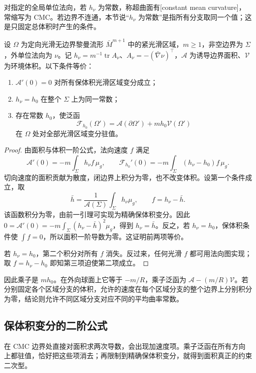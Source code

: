 对指定的全局单位法向，若 \(h_\nu\) 为常数，称超曲面有[constant mean curvature]，常缩写为 CMC。若边界不连通，本节说“\(h_\nu\) 为常数”是指所有分支取同一个值；这是只固定总体积时产生的条件。

\begin{theorem}\label{g3:thm:cmc-volume-critical}
	设 \(\Omega\) 为定向光滑无边界黎曼流形 \(\bar M^{m+1}\) 中的紧光滑区域，\(m\ge1\)，非空边界为 \(\Sigma\)，外单位法向为 \(\nu\)。记 \(h_\nu=m^{-1}\operatorname{tr}A_\nu\)、\(A_\nu=-(\bar\nabla\nu)^\top\)，\(\mathcal A\) 为诱导边界面积、\(\mathcal V\) 为环境体积。以下条件等价：
	\begin{enumerate}
		\item \(\mathcal A'(0)=0\) 对所有保体积光滑区域变分成立；
		\item \(h_\nu=h_0\) 在整个 \(\Sigma\) 上为同一常数；
		\item 存在常数 \(h_0\)，使泛函
		\begin{equation}\label{g3:eq:cmc-augmented-functional}
			\mathcal F_{h_0}(\Omega')
			=\mathcal A(\partial\Omega')+m h_0\mathcal V(\Omega')
		\end{equation}
		在 \(\Omega\) 处对全部光滑区域变分驻值。
	\end{enumerate}
\end{theorem}
\begin{proof}
	由面积与体积一阶公式，法向速度 \(f\) 满足
	\[
		\mathcal A'(0)=-m\int_\Sigma h_\nu f\,\mu_g,
		\qquad
		\mathcal F_{h_0}'(0)=-m\int_\Sigma(h_\nu-h_0)f\,\mu_g.
	\]
	切向速度的面积贡献为散度，闭边界上积分为零，也不改变体积。设第一个条件成立，取
	\[
		\bar h=\frac1{\mathcal A(\Sigma)}\int_\Sigma h_\nu\mu_g,
		\qquad f=h_\nu-\bar h.
	\]
	该函数积分为零，由前一引理可实现为精确保体积变分。因此
	\(0=\mathcal A'(0)=-m\int_\Sigma(h_\nu-\bar h)^2\mu_g\)，得到 \(h_\nu=\bar h\)。反之，若 \(h_\nu=h_0\)，保体积条件使 \(\int f=0\)，所以面积一阶导数为零。这证明前两项等价。

	若 \(h_\nu=h_0\)，第二个积分对所有 \(f\) 消失。反过来，任何光滑 \(f\) 都可用法向图实现；取 \(f=h_\nu-h_0\) 即知第三项迫使第二项成立。
\end{proof}

因此乘子是 \(m h_0\)。在外向球面上它等于 \(-m/R\)，乘子泛函为 \(\mathcal A-(m/R)\mathcal V\)。若分别固定各个区域分支的体积，允许的速度在每个区域分支的整个边界上分别积分为零，结论则允许不同区域分支对应不同的平均曲率常数。

\subsection{保体积变分的二阶公式}
\label{g3:subsec:1905:03}
在 CMC 边界处直接对面积求两次导数，会出现加速度项。乘子泛函在所有方向上都驻值，恰好把这些项消去；再限制到精确保体积变分，就得到面积真正的约束二次型。

